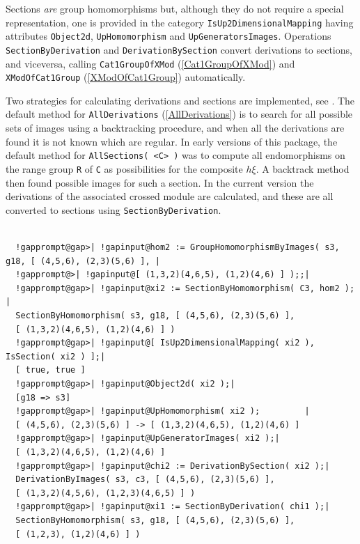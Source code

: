 \documentclass[a4paper,11pt]{report}
\begin{document}
{{{ Sections \emph{are} group homomorphisms but, although they do not require a special
representation, one is provided in the category \texttt{IsUp2DimensionalMapping} having attributes \texttt{Object2d}, \texttt{UpHomomorphism} and \texttt{UpGeneratorsImages}. Operations \texttt{SectionByDerivation} and \texttt{DerivationBySection} convert derivations to sections, and vice\texttt{}versa, calling \texttt{Cat1GroupOfXMod} (\ref{Cat1GroupOfXMod}) and \texttt{XModOfCat1Group} (\ref{XModOfCat1Group}) automatically. 

 Two strategies for calculating derivations and sections are implemented, see \cite{AW1}. The default method for \texttt{AllDerivations} (\ref{AllDerivations}) is to search for all possible sets of images using a backtracking procedure,
and when all the derivations are found it is not known which are regular. In
early versions of this package, the default method for \texttt{AllSections( {\textless}C{\textgreater} )} was to compute all endomorphisms on the range group \texttt{R} of \texttt{C} as possibilities for the composite $h \xi$. A backtrack method then found possible images for such a section. In the
current version the derivations of the associated crossed module are
calculated, and these are all converted to sections using \texttt{SectionByDerivation}. }

 

 
\begin{Verbatim}[commandchars=!@|,fontsize=\small,frame=single,label=Example]
  
  !gapprompt@gap>| !gapinput@hom2 := GroupHomomorphismByImages( s3, g18, [ (4,5,6), (2,3)(5,6) ], |
  !gapprompt@>| !gapinput@[ (1,3,2)(4,6,5), (1,2)(4,6) ] );;|
  !gapprompt@gap>| !gapinput@xi2 := SectionByHomomorphism( C3, hom2 );                                 |
  SectionByHomomorphism( s3, g18, [ (4,5,6), (2,3)(5,6) ], 
  [ (1,3,2)(4,6,5), (1,2)(4,6) ] )
  !gapprompt@gap>| !gapinput@[ IsUp2DimensionalMapping( xi2 ), IsSection( xi2 ) ];|
  [ true, true ]
  !gapprompt@gap>| !gapinput@Object2d( xi2 );|
  [g18 => s3]
  !gapprompt@gap>| !gapinput@UpHomomorphism( xi2 );         |
  [ (4,5,6), (2,3)(5,6) ] -> [ (1,3,2)(4,6,5), (1,2)(4,6) ]
  !gapprompt@gap>| !gapinput@UpGeneratorImages( xi2 );|
  [ (1,3,2)(4,6,5), (1,2)(4,6) ]
  !gapprompt@gap>| !gapinput@chi2 := DerivationBySection( xi2 );|
  DerivationByImages( s3, c3, [ (4,5,6), (2,3)(5,6) ], 
  [ (1,3,2)(4,5,6), (1,2,3)(4,6,5) ] )
  !gapprompt@gap>| !gapinput@xi1 := SectionByDerivation( chi1 );|
  SectionByHomomorphism( s3, g18, [ (4,5,6), (2,3)(5,6) ], 
  [ (1,2,3), (1,2)(4,6) ] )
  

\end{Verbatim}}}
\end{document}
